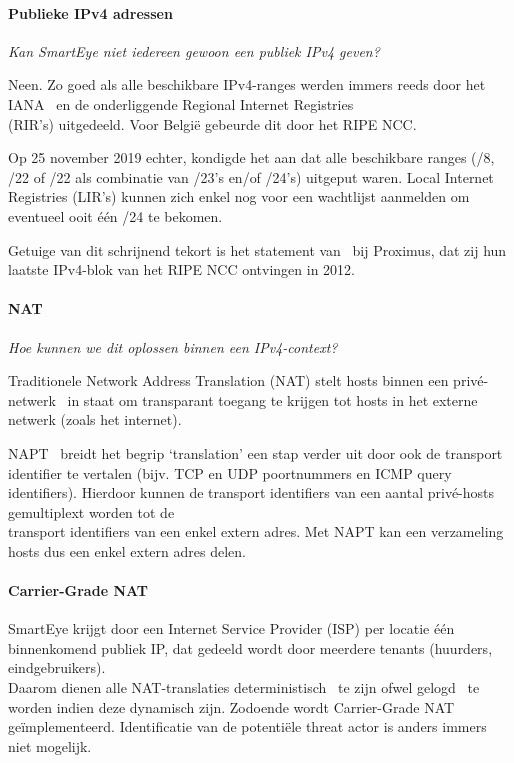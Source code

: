 \paragraph{Publieke IPv4 adressen}
\emph{Kan SmartEye niet iedereen gewoon een publiek IPv4 geven? }

Neen. Zo goed als alle beschikbare IPv4-ranges werden immers reeds door het IANA~\autocite{ICANN2012} en de onderliggende Regional Internet Registries\\\autocite{Gerich1993} (RIR’s) uitgedeeld. Voor België gebeurde dit door het RIPE NCC.

Op 25 november 2019 echter, kondigde het \textcite{RIPE_NCC2019}  aan dat alle beschikbare ranges (/8, /22 of /22 als combinatie van /23’s en/of /24’s) uitgeput waren. Local Internet Registries (LIR’s) kunnen zich enkel nog voor een wachtlijst aanmelden om eventueel ooit één /24 te bekomen.

Getuige van dit schrijnend tekort is het statement van~\textcite{Neuckens2022} bij Proximus, dat zij hun laatste IPv4-blok van het RIPE NCC ontvingen in 2012.

\paragraph{NAT}
\emph{Hoe kunnen we dit oplossen binnen een IPv4-context?}

Traditionele Network Address Translation (NAT) stelt hosts binnen een privé-netwerk~\autocite{Moskowitz1996} in staat om transparant toegang te krijgen tot hosts in het externe netwerk (zoals het internet).

NAPT~\autocite{Holdrege1999} breidt het begrip ‘translation’ een stap verder uit door ook de transport identifier te vertalen (bijv. TCP en UDP poortnummers en ICMP query identifiers). Hierdoor kunnen de transport identifiers van een aantal privé-hosts gemultiplext worden tot de\\transport identifiers van een enkel extern adres. Met NAPT kan een verzameling hosts dus een enkel extern adres delen.

\paragraph{Carrier-Grade NAT}
SmartEye krijgt door een Internet Service Provider (ISP) per locatie één binnenkomend publiek IP, dat gedeeld wordt door meerdere tenants (huurders, eindgebruikers).\\ Daarom dienen alle NAT-translaties deterministisch~\autocite{Donley2014} te zijn ofwel gelogd~\autocite{Perreault2013} te worden indien deze dynamisch zijn. Zodoende wordt Carrier-Grade NAT geïmplementeerd. Identificatie van de potentiële threat actor is anders immers niet mogelijk.


